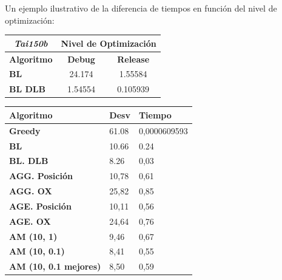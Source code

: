 \documentclass[a4paper, 12pt]{article}
\begin{document}
      Un ejemplo ilustrativo de la diferencia de tiempos en función del nivel de optimización:
      
\begin{table}[H]
\centering
\label{my-label}
\begin{tabular}{l|c|c|}
\cline{2-3}
\multicolumn{1}{c|}{{\textit{Tai150b}}} & \multicolumn{2}{c|}{\textbf{Nivel de Optimización}} \\ \hline
\multicolumn{1}{|c|}{\textbf{Algoritmo}}    & \textbf{Debug}          & \textbf{Release}          \\ \hline
\multicolumn{1}{|l|}{\textbf{BL}}           & 24.174                  & 1.55584                   \\ \hline
\multicolumn{1}{|l|}{\textbf{BL DLB}}       & 1.54554                 & 0.105939                  \\ \hline
\end{tabular}
\end{table}

	\newpage
	\begin{table}[H]
\centering
\label{my-label}
\begin{tabular}{|l|l|l|}
\hline
\textbf{Algoritmo}            & \textbf{Desv} & \textbf{Tiempo} \\ \hline
\textbf{Greedy}               & 61.08         & 0,0000609593    \\ \hline
\textbf{BL}                   & 10.66         & 0.24            \\ \hline
\textbf{BL. DLB}              & 8.26          & 0,03            \\ \hline
\textbf{AGG. Posición}        & 10,78         & 0,61            \\ \hline
\textbf{AGG. OX}              & 25,82         & 0,85            \\ \hline
\textbf{AGE. Posición}        & 10,11         & 0,56            \\ \hline
\textbf{AGE. OX}              & 24,64         & 0,76            \\ \hline
\textbf{AM (10, 1)}           & 9,46          & 0,67            \\ \hline
\textbf{AM (10, 0.1)}         & 8,41          & 0,55            \\ \hline
\textbf{AM (10, 0.1 mejores)} & 8,50          & 0,59            \\ \hline
\end{tabular}
\end{table}
\end{document}
